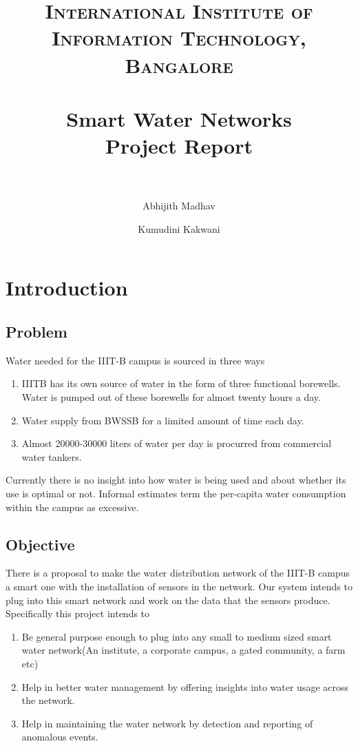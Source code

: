 \documentclass[11pt]{report} %
\title{	
\normalfont \normalsize 
\textsc{International Institute of Information Technology, Bangalore} \\ [25pt] %
\horrule{0.5pt} \\[0.4cm] %
\huge Smart Water Networks \\ Project Report \\ %
\horrule{2pt} \\[0.5cm] %
}
\author{Abhijith Madhav \and Kumudini Kakwani}
\begin{document}
\maketitle

\tableofcontents


\chapter{Introduction}
\section{Problem}
Water needed for the IIIT-B campus is sourced in three ways
\begin{enumerate}
\item
IIITB has its own source of water in the form of three functional borewells. Water is pumped out of these borewells for almost twenty hours a day. 
\item
Water supply from BWSSB for a limited amount of time each day.
\item
Almost 20000-30000 liters of water per day is procurred from commercial water tankers.
\end{enumerate}
Currently there is no insight into how water is being used and about whether its use is optimal or not. Informal estimates term the per-capita water consumption within the campus as excessive.

\section{Objective}
There is a proposal to make the water distribution network of the IIIT-B campus a smart one with the installation of sensors in the network. Our system intends to plug into this smart network and work on the data that the sensors produce. \\

Specifically this project intends to
\begin{enumerate}
\item
Be general purpose enough to plug into any small to medium sized smart water network(An institute, a corporate campus, a gated community, a farm etc)
\item
Help in better water management by offering insights into water usage across the network.
\item
Help in maintaining the water network by detection and reporting of anomalous events.
\end{enumerate}
\end{document}
